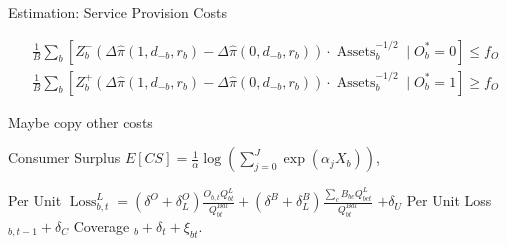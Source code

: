 \documentclass[notes,10pt, aspectratio=169]{beamer}
\newenvironment{wideitemize}{\itemize\addtolength{\itemsep}{10pt}}{\enditemize}
\begin{document}
\begin{frame}{Estimation: Service Provision Costs}

    \begin{wideitemize}

        \item \textcolor{blue}{}
         $$\begin{aligned} & \frac{1}{B} \sum_b\left[Z_b^{-}\left(\Delta \hat{\pi}\left(1, d_{-b}, r_b\right)-\Delta \hat{\pi}\left(0, d_{-b}, r_b\right)\right) \cdot \operatorname{Assets}_b^{-1 / 2} \mid O_b^*=0\right] \leq f_O \\ & \frac{1}{B} \sum_b\left[Z_b^{+}\left(\Delta \hat{\pi}\left(1, d_{-b}, r_b\right)-\Delta \hat{\pi}\left(0, d_{-b}, r_b\right)\right) \cdot \operatorname{Assets}_b^{-1 / 2} \mid O_b^*=1\right] \geq f_O\end{aligned}$$
  
         \item Maybe copy other costs
        \item Consumer Surplus 
 $E[C S]=\frac{1}{\alpha} \log \left(\sum_{j=0}^J \exp \left(\alpha_j X_b\right)\right)$,

 \item Per Unit $\operatorname{Loss}_{b, t}^L=\left(\delta^O+\delta_L^O\right) \frac{O_{b, t} Q_{b t}^L}{Q_{b t}^{B a l}}+\left(\delta^B+\delta_L^B\right) \frac{\sum_c B_{b c} Q_{b c t}^L}{Q_{b t}^{B a l}}$
 $+\delta_U$ Per Unit Loss $_{b, t-1}+\delta_C$ Coverage $_b+\delta_t+\xi_{b t}$.
    \end{wideitemize}

\end{frame}

   

\end{document}
